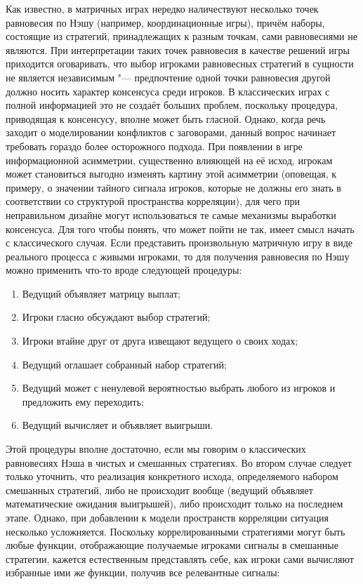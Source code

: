 Как известно, в матричных играх нередко наличествуют несколько точек равновесия по Нэшу (например, координационные игры), причём наборы, состоящие из стратегий, принадлежащих к разным точкам, сами равновесиями не являются. При интерпретации таких точек равновесия в качестве решений игры приходится оговаривать, что выбор игроками равновесных стратегий в сущности не является независимым "--- предпочтение одной точки равновесия другой должно носить характер консенсуса среди игроков. В классических играх с полной информацией это не создаёт больших проблем, поскольку процедура, приводящая к консенсусу, вполне может быть гласной. Однако, когда речь заходит о моделировании конфликтов с заговорами, данный вопрос начинает требовать гораздо более осторожного подхода. При появлении в игре информационной асимметрии, существенно влияющей на её исход, игрокам может становиться выгодно изменять картину этой асимметрии (оповещая, к примеру, о значении тайного сигнала игроков, которые не должны его знать в соответствии со структурой пространства корреляции), для чего при неправильном дизайне могут использоваться те самые механизмы выработки консенсуса. Для того чтобы понять, что может пойти не так, имеет смысл начать с классического случая. Если представить произвольную матричную игру в виде реального процесса с живыми игроками, то для получения равновесия по Нэшу можно применить что-то вроде следующей процедуры:

\begin{enumerate}
	\item Ведущий объявляет матрицу выплат;
	\item Игроки гласно обсуждают выбор стратегий;
	\item Игроки втайне друг от друга извещают ведущего о своих ходах;
	\item Ведущий оглашает собранный набор стратегий;
	\item Ведущий может с ненулевой вероятностью выбрать любого из игроков и предложить ему переходить;
	\item Ведущий вычисляет и объявляет выигрыши.
\end{enumerate}

Этой процедуры вполне достаточно, если мы говорим о классических равновесиях Нэша в чистых и смешанных стратегиях. Во втором случае следует только уточнить, что реализация конкретного исхода, определяемого набором смешанных стратегий, либо не происходит вообще (ведущий объявляет математические ожидания выигрышей), либо происходит только на последнем этапе. Однако, при добавлении к модели пространств корреляции ситуация несколько усложняется. Поскольку коррелированными стратегиями могут быть любые функции, отображающие получаемые игроками сигналы в смешанные стратегии, кажется естественным представлять себе, как игроки сами вычисляют избранные ими же функции, получив все релевантные сигналы:

